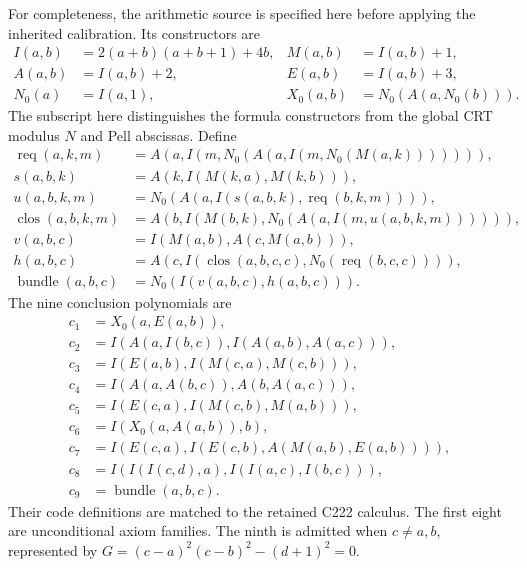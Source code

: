 For completeness, the arithmetic source is specified here before applying
the inherited calibration. Its constructors are
\[
 \begin{aligned}
 I(a,b)&=2(a+b)(a+b+1)+4b,& M(a,b)&=I(a,b)+1,\\
 A(a,b)&=I(a,b)+2,&E(a,b)&=I(a,b)+3,\\
 N_0(a)&=I(a,1),&X_0(a,b)&=N_0(A(a,N_0(b))).
 \end{aligned}
\]
The subscript here distinguishes the formula constructors from the global
CRT modulus $N$ and Pell abscissas. Define
\[
 \begin{aligned}
 \operatorname{req}(a,k,m)
   &=A(a,I(m,N_0(A(a,I(m,N_0(M(a,k))))))),\\
 s(a,b,k)&=A(k,I(M(k,a),M(k,b))),\\
 u(a,b,k,m)&=N_0(A(a,I(s(a,b,k),\operatorname{req}(b,k,m)))),\\
 \operatorname{clos}(a,b,k,m)
   &=A(b,I(M(b,k),N_0(A(a,I(m,u(a,b,k,m)))))),\\
 v(a,b,c)&=I(M(a,b),A(c,M(a,b))),\\
 h(a,b,c)&=A(c,I(\operatorname{clos}(a,b,c,c),
                          N_0(\operatorname{req}(b,c,c)))),\\
 \operatorname{bundle}(a,b,c)&=N_0(I(v(a,b,c),h(a,b,c))).
 \end{aligned}
\]
The nine conclusion polynomials are
\begin{align*}
 c_1&=X_0(a,E(a,b)),\\
 c_2&=I(A(a,I(b,c)),I(A(a,b),A(a,c))),\\
 c_3&=I(E(a,b),I(M(c,a),M(c,b))),\\
 c_4&=I(A(a,A(b,c)),A(b,A(a,c))),\\
 c_5&=I(E(c,a),I(M(c,b),M(a,b))),\\
 c_6&=I(X_0(a,A(a,b)),b),\\
 c_7&=I(E(c,a),I(E(c,b),A(M(a,b),E(a,b)))),\\
 c_8&=I(I(I(c,d),a),I(I(a,c),I(b,c))),\\
 c_9&=\operatorname{bundle}(a,b,c).
\end{align*}
Their code definitions are matched to the retained C222 calculus.
The first eight are unconditional axiom families. The ninth is admitted
when $c\ne a,b$, represented by
$G=(c-a)^2(c-b)^2-(d+1)^2=0$.

